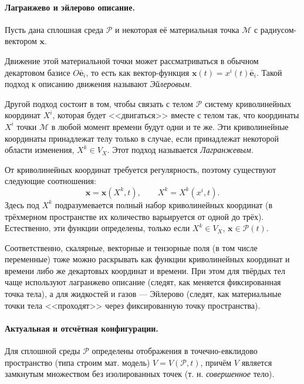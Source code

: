 \paragraph{Лагранжево и эйлерово описание.} Пусть дана сплошная среда $ \mathcal
P$ и некоторая её материальная точка $ \mathcal
M$ с радиусом-вектором $ \mathbf{x} $. 

Движение этой материальной точки может
рассматриваться в обычном декартовом базисе $ O\mathbf{\bar{e}}_i $, то есть как
вектор-функция $ \mathbf{x}(t) =
x^i(t)\mathbf{\bar{e}}_i  $. Такой подход к описанию движения называют
\emph{Эйлеровым}.

Другой подход состоит в том, чтобы связать с телом $ \mathcal{P} $ систему
криволинейных координат $ X^i $, которая будет <<двигаться>> вместе с телом
так, что координаты $ X^i $ точки $ \mathcal M $ в любой момент времени будут
одни и те же. Эти криволинейные координаты принадлежат телу только в случае,
если принадлежат некоторой области изменения, $ X^k \in V_X $. Этот подход
называется \emph{Лагранжевым}.

От криволинейных координат требуется регулярность, поэтому существуют следующие
соотношения: 
\[
  \mathbf{x} = \mathbf{x}(X^k, t), \qquad X^k = X^k(x^i, t).
\]
Здесь под $ X^k $ подразумевается полный набор криволинейных координат (в
трёхмерном пространстве их количество варьируется от одной до трёх).
Естественно, эти функции определены, только если $ X^k \in V_X $, $ \mathbf x \in
\mathcal P(t) $.

Соответственно, скалярные, векторные и тензорные поля (в том числе переменные)
тоже можно раскрывать как функции
криволинейных координат и времени либо же декартовых координат и времени. При
этом для твёрдых тел чаще используют лагранжево описание (следят, как меняется
фиксированная точка тела), а для жидкостей и газов --- Эйлерово (следят, как
материальные точки тела <<проходят>> через фиксированную точку пространства).

\paragraph{Актуальная и отсчётная конфигурации.} Для сплошной среды $ \mathcal P
$ определены отображения в точечно-евклидово пространство (типа строим мат. модель) $
V = V(\mathcal P, t)$, причём $ V $ является замкнутым множеством без
изолированных точек (т. н. \emph{совершенное} тело). 

